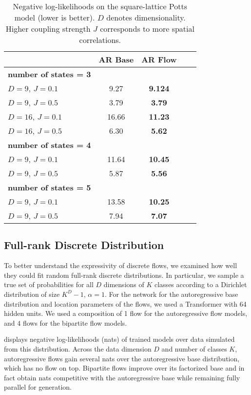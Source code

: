 \documentclass{article}
\begin{document}
\begin{table*}[!t]
\centering
\begin{tabular}{lcccc} \\  \toprule
& AR Base & AR Flow \\ \midrule
\textbf{number of states = 3} & & \\
\hfill  $D=9$,  $J=0.1$ & 9.27 & \textbf{9.124} \\
\hfill  $D=9$,  $J=0.5$ & 3.79 & \textbf{3.79} \\
\hfill  $D=16$,  $J=0.1$ & 16.66 & \textbf{11.23} \\
\hfill  $D=16$,  $J=0.5$ & 6.30 & \textbf{5.62} \\

\textbf{number of states = 4} & & \\
\hfill $D=9$,  $J=0.1$ & 11.64 & \textbf{10.45} \\
\hfill $D=9$,  $J=0.5$ & 5.87 & \textbf{5.56} \\

\textbf{number of states = 5} & & \\
\hfill $D=9$,  $J=0.1$ & 13.58 & \textbf{10.25} \\
\hfill $D=9$,  $J=0.5$ & 7.94 & \textbf{7.07} \\
\bottomrule
\end{tabular}
\caption{{Negative log-likelihoods on the square-lattice Potts model (lower is better).} $D$ denotes dimensionality. Higher coupling strength $J$ corresponds to more spatial correlations.}
\label{table:potts}
\end{table*}



\subsection{Full-rank Discrete Distribution}
To better understand the expressivity of discrete flows, we examined how well they could fit random full-rank discrete distributions. In particular, we sample a true set of probabilities for all $D$ dimensions of $K$ classes according to a Dirichlet distribution of size $K^{D}-1$, $\alpha=1$.
For the network for the autoregressive base distribution and location parameters of the flows, we used a Transformer with 64 hidden units. We used a composition of 1 flow for the autoregressive flow models, and 4 flows for the bipartite flow models.

 displays negative log-likelihoods (nats) of trained models over data simulated from this distribution.
Across the data dimension $D$ and number of classes $K$, autoregressive flows gain several nats over the autoregressive base distribution, which has no flow on top.
Bipartite flows improve over its factorized base and in fact obtain nats competitive with the autoregressive base while remaining fully parallel for generation.
\end{document}
